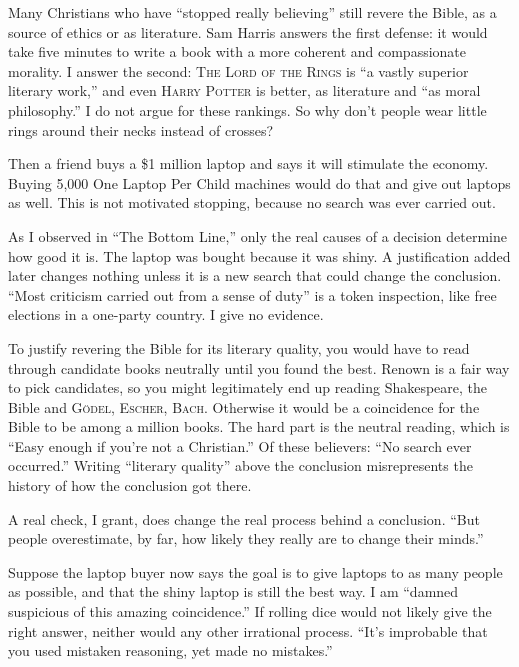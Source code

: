 
Many Christians who have ``stopped really believing'' still revere the Bible, as a source of ethics or as literature.  Sam Harris answers the first defense: it would take five minutes to write a book with a more coherent and compassionate morality. I answer the second: \textsc{The Lord of the Rings} is ``a vastly superior literary work,'' and even \textsc{Harry Potter} is better, as literature and ``as moral philosophy.'' I do not argue for these rankings. So why don't people wear little rings around their necks instead of crosses?

Then a friend buys a \$1 million laptop and says it will stimulate the economy. Buying 5,000 One Laptop Per Child machines would do that and give out laptops as well. This is not motivated stopping, because no search was ever carried out.

As I observed in ``The Bottom Line,'' only the real causes of a decision determine how good it is. The laptop was bought because it was shiny. A justification added later changes nothing unless it is a new search that could change the conclusion. ``Most criticism carried out from a sense of duty'' is a token inspection, like free elections in a one-party country. I give no evidence. 

To justify revering the Bible for its literary quality, you would have to read through candidate books neutrally until you found the best. Renown is a fair way to pick candidates, so you might legitimately end up reading Shakespeare, the Bible and \textsc{G\"odel, Escher, Bach}. Otherwise it would be a coincidence for the Bible to be among a million books. The hard part is the neutral reading, which is ``Easy enough if you're not a Christian.''  Of these believers: ``No search ever occurred.'' Writing ``literary quality'' above the conclusion misrepresents the history of how the conclusion got there. 

A real check, I grant, does change the real process behind a conclusion. ``But people overestimate, by far, how likely they really are to change their minds.'' 

Suppose the laptop buyer now says the goal is to give laptops to as many people as possible, and that the shiny laptop is still the best way. I am ``damned suspicious of this amazing coincidence.'' If rolling dice would not likely give the right answer, neither would any other irrational process. ``It's improbable that you used mistaken reasoning, yet made no mistakes.''
